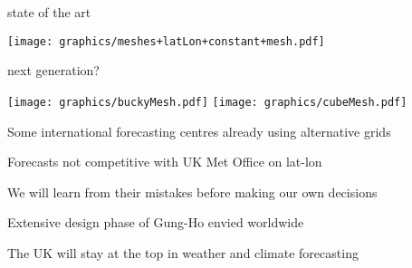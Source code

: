 \begin{slide}

\begin{center}
\begin{minipage}[t]{0.33\linewidth}
\hspace{-1cm}
state of the art

\raggedleft
\texttt{[image: graphics/meshes+latLon+constant+mesh.pdf]}
\end{minipage}
\begin{minipage}[t]{0.66\linewidth}\centering
next generation?

\raggedleft
\texttt{[image: graphics/buckyMesh.pdf]}
\texttt{[image: graphics/cubeMesh.pdf]}
\end{minipage}
\end{center}

\begin{list0}
\item Some international forecasting centres already using alternative grids
\item Forecasts not competitive with UK Met Office on lat-lon
\item We will learn from their mistakes before making our own decisions
\item Extensive design phase of Gung-Ho envied worldwide
\item The UK will stay at the top in weather and climate forecasting

\end{list0}

\end{slide}
